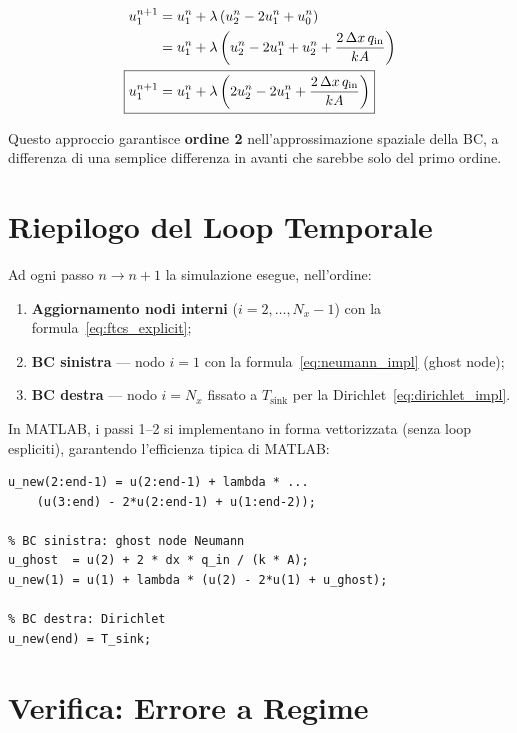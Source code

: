 \documentclass[11pt, a4paper]{article}
\begin{document}
\begin{align}
  u_1^{n+1} &= u_1^n + \lambda \left( u_2^n - 2u_1^n + u_0^n \right) \notag\\
             &= u_1^n + \lambda \left( u_2^n - 2u_1^n + u_2^n + \frac{2\,\Delta x\, q_\text{in}}{k A} \right) \notag\\
	\Aboxed{u_1^{n+1} &= u_1^n + \lambda \left( 2u_2^n - 2u_1^n + \frac{2\,\Delta x\, q_\text{in}}{k A} \right)}
  \label{eq:neumann_impl}
\end{align}

Questo approccio garantisce \textbf{ordine 2} nell'approssimazione spaziale della BC, a differenza di una semplice differenza in avanti che sarebbe solo del primo ordine.

\section{Riepilogo del Loop Temporale}

Ad ogni passo $n \to n+1$ la simulazione esegue, nell'ordine:

\begin{enumerate}
  \item \textbf{Aggiornamento nodi interni} ($i = 2, \ldots, N_x-1$) con la formula~\eqref{eq:ftcs_explicit};
  \item \textbf{BC sinistra} — nodo $i=1$ con la formula~\eqref{eq:neumann_impl} (ghost node);
  \item \textbf{BC destra} — nodo $i=N_x$ fissato a $T_\text{sink}$ per la Dirichlet~\eqref{eq:dirichlet_impl}.
\end{enumerate}

In MATLAB, i passi 1--2 si implementano in forma vettorizzata (senza loop espliciti), garantendo l'efficienza tipica di MATLAB:

\begin{lstlisting}[style=matlab, caption={Kernel del loop temporale in MATLAB}]
% Nodi interni (FTCS)
u_new(2:end-1) = u(2:end-1) + lambda * ...
    (u(3:end) - 2*u(2:end-1) + u(1:end-2));

% BC sinistra: ghost node Neumann
u_ghost  = u(2) + 2 * dx * q_in / (k * A);
u_new(1) = u(1) + lambda * (u(2) - 2*u(1) + u_ghost);

% BC destra: Dirichlet
u_new(end) = T_sink;
\end{lstlisting}

\section{Verifica: Errore a Regime}
\end{document}
